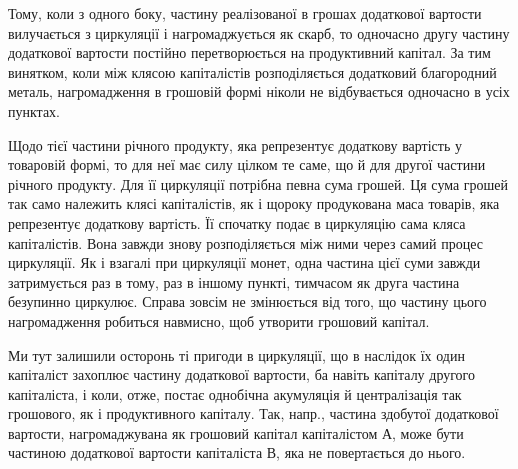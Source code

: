 
Тому, коли з одного боку, частину реалізованої в грошах додаткової
вартости вилучається з циркуляції і нагромаджується як скарб, то одночасно
другу частину додаткової вартости постійно перетворюється на
продуктивний капітал. За тим винятком, коли між клясою капіталістів
розподіляється додатковий благородний металь, нагромадження в грошовій
формі ніколи не відбувається одночасно в усіх пунктах.

Щодо тієї частини річного продукту, яка репрезентує додаткову
вартість у товаровій формі, то для неї має силу цілком те саме, що й
для другої частини річного продукту. Для її циркуляції потрібна певна
сума грошей. Ця сума грошей так само належить клясі капіталістів, як
і щороку продукована маса товарів, яка репрезентує додаткову вартість.
Її спочатку подає в циркуляцію сама кляса капіталістів. Вона завжди
знову розподіляється між ними через самий процес циркуляції. Як і взагалі
при циркуляції монет, одна частина цієї суми завжди затримується
раз в тому, раз в іншому пункті, тимчасом як друга частина безупинно
циркулює. Справа зовсім не змінюється від того, що частину цього нагромадження
робиться навмисно, щоб утворити грошовий капітал.

Ми тут залишили осторонь ті пригоди в циркуляції, що в наслідок
їх один капіталіст захоплює частину додаткової вартости, ба навіть
капіталу другого капіталіста, і коли, отже, постає однобічна акумуляція
й централізація так грошового, як і продуктивного капіталу. Так, напр.,
частина здобутої додаткової вартости, нагромаджувана як грошовий
капітал капіталістом А, може бути частиною додаткової вартости капіталіста
В, яка не повертається до нього.
